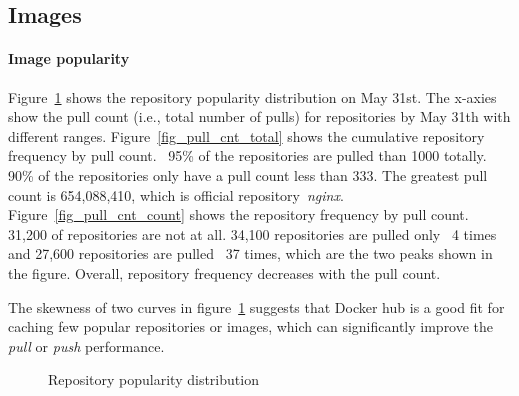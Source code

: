 \subsection{Images}
\label{sec:images}

\paragraph{Image popularity}
%
Figure~\ref{fig-pop} shows the repository popularity distribution on May 31st.
The x-axies show the pull count (i.e., total number of pulls) for repositories
by May 31th with different ranges.  Figure~\ref{fig_pull_cnt_total} shows the
cumulative repository frequency by pull count. ~95\% of the repositories are
pulled than 1000 totally. 90\% of the repositories only have a pull count less
than 333. The greatest pull count is 654,088,410, which is official
repository~\textit{nginx}.  Figure~\ref{fig_pull_cnt_count} shows the
repository frequency by pull count. 31,200 of repositories are not at all.
34,100 repositories are pulled only ~4 times and 27,600 repositories are pulled
~37 times, which are the two peaks shown in the figure.  Overall, repository
frequency decreases with the pull count.

The skewness of two curves in figure~\ref{fig-pop} suggests that Docker hub is
a good fit for caching few popular repositories or images, which can
significantly improve the \textit{pull} or \textit{push} performance.      

\begin{figure}[!t]
	\centering
	\caption{Repository popularity distribution}
	\label{fig-pop}
\end{figure}

